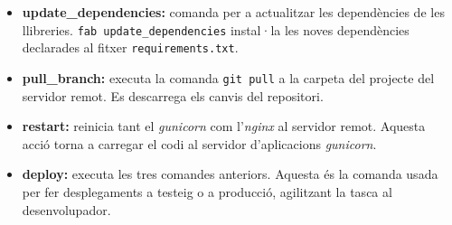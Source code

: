 \begin{itemize}
	\item \textbf{update\_dependencies:} comanda per a actualitzar les dependències de les llibreries. \texttt{fab update\_dependencies} instal·la les noves dependències declarades al fitxer \texttt{requirements.txt}.
	\item \textbf{pull\_branch:} executa la comanda \texttt{git pull} a la carpeta del projecte del servidor remot. Es descarrega els canvis del repositori.
	\item \textbf{restart:} reinicia tant el \emph{gunicorn} com l'\emph{nginx} al servidor remot. Aquesta acció torna a carregar el codi al servidor d'aplicacions \emph{gunicorn}.
	\item \textbf{deploy:} executa les tres comandes anteriors. Aquesta és la comanda usada per fer desplegaments a testeig o a producció, agilitzant la tasca al desenvolupador.
\end{itemize}